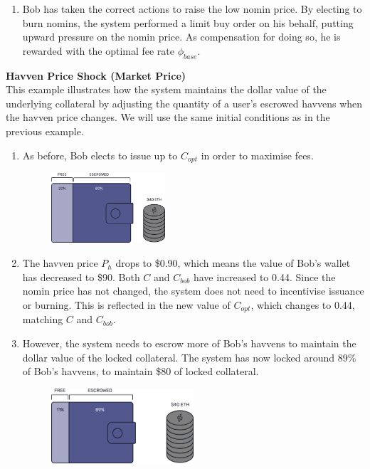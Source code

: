 \begin{enumerate}
    \item{Bob has taken the correct actions to raise the low nomin price. By
          electing to burn nomins, the system performed a limit buy order on his
          behalf, putting upward pressure on the nomin price. As compensation for doing
          so, he is rewarded with the optimal fee rate \(\phi_{base}\).
    }
\end{enumerate}


\newpage
\noindent \textbf{Havven Price Shock (Market Price)} \\

\noindent This example illustrates how the system maintains the dollar value of the underlying
collateral by adjusting the quantity of a user's escrowed havvens when the
havven price changes. We will use the same initial conditions as in the previous example.

\begin{enumerate}
    \item{As before, Bob elects to issue up to \(C_{opt}\) in order to maximise fees.}
    \begin{figure}[h!]
        \centering
        \includegraphics[width=0.4\textwidth]{img/escrowed}
    \end{figure}

    \item{The havven price \(P_h\) drops to \$0.90, which means the value of
          Bob's wallet has decreased to \$90. Both \(C\) and \(C_{bob}\) have increased to
          0.44. Since the nomin price has not changed, the system does not need to
          incentivise issuance or burning. This is reflected in the new value of
          \(C_{opt}\), which changes to 0.44, matching \(C\) and \(C_{bob}\).
    }

    \item{However, the system needs to escrow more of Bob's havvens to
          maintain the dollar value of the locked collateral. The system has now
          locked around 89\% of Bob's havvens, to maintain \$80 of locked
          collateral.
    }

    \begin{figure}[h!]
        \centering
        \includegraphics[width=0.5\textwidth]{img/ph_drop}
    \end{figure}
\end{enumerate} 


